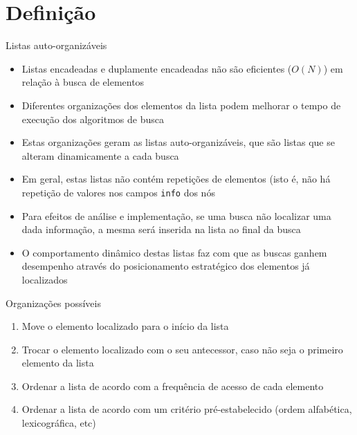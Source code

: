 \section{Definição}

\begin{frame}[fragile]{Listas auto-organizáveis}

    \begin{itemize}
        \item Listas encadeadas e duplamente encadeadas não são eficientes ($O(N)$) em relação 
            à busca de elementos

        \item Diferentes organizações dos elementos da lista podem melhorar o tempo de execução
            dos algoritmos de busca

        \item Estas organizações geram as listas auto-organizáveis, que são listas que se 
            alteram dinamicamente a cada busca

        \item Em geral, estas listas não contém repetições de elementos (isto é, não há repetição
            de valores nos campos \texttt{info} dos nós

        \item Para efeitos de análise e implementação, se uma busca não localizar uma dada
            informação, a mesma será inserida na lista ao final da busca

        \item O comportamento dinâmico destas listas faz com que as buscas ganhem desempenho
            através do posicionamento estratégico dos elementos já localizados
    \end{itemize}

\end{frame}

\begin{frame}[fragile]{Organizações possíveis}

    \begin{enumerate}
        \item Move o elemento localizado para o início da lista

        \item Trocar o elemento localizado com o seu antecessor, caso não seja o primeiro 
            elemento da lista

        \item Ordenar a lista de acordo com a frequência de acesso de cada elemento

        \item Ordenar a lista de acordo com um critério pré-estabelecido (ordem alfabética,
            lexicográfica, etc)
    \end{enumerate}

\end{frame}

